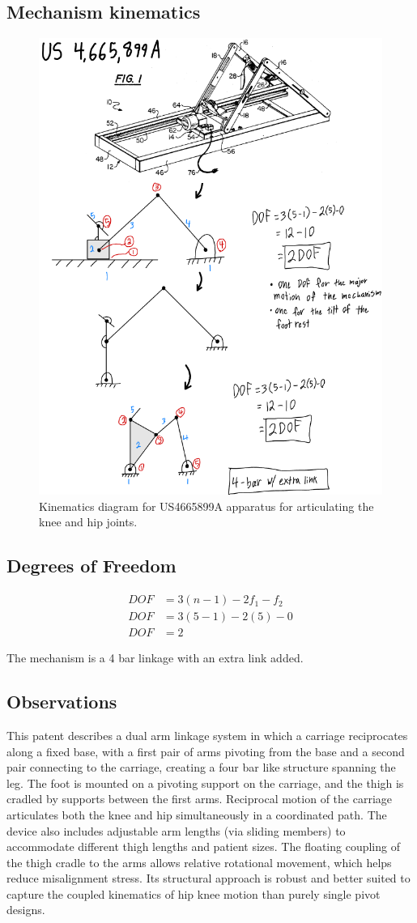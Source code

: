 \documentclass[11pt]{article}
\begin{document}
\subsection{Mechanism kinematics}
\begin{figure}[H]
  \centering
  \includegraphics[width=0.54\linewidth]{../Kinematic Mechanism Images/4665899.png}
  \caption{Kinematics diagram for US4665899A apparatus for articulating the knee and hip joints.}
  \label{fig:US4665899A_kinematics}
\end{figure}

\subsection{Degrees of Freedom}
\[
\begin{aligned}
DOF &= 3(n-1) - 2f_1 - f_2 \\
DOF &= 3(5-1) - 2(5) - 0 \\
DOF &= 2
\end{aligned}
\]

The mechanism is a 4 bar linkage with an extra link added.

\subsection{Observations}
This patent describes a dual arm linkage system in which a carriage reciprocates along a fixed base, with a first pair of arms pivoting from the base and a second pair connecting to the carriage, creating a four bar like structure spanning the leg. The foot is mounted on a pivoting support on the carriage, and the thigh is cradled by supports between the first arms. Reciprocal motion of the carriage articulates both the knee and hip simultaneously in a coordinated path. The device also includes adjustable arm lengths (via sliding members) to accommodate different thigh lengths and patient sizes. The floating coupling of the thigh cradle to the arms allows relative rotational movement, which helps reduce misalignment stress. Its structural approach is robust and better suited to capture the coupled kinematics of hip knee motion than purely single pivot designs.
\end{document}

